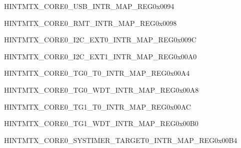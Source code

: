 \begin{register}{H}{INTMTX\_CORE0\_USB\_INTR\_MAP\_REG}{0x0094}\label{regdesc:INTMTXCORE0USBINTRMAPREG}
\end{register}\vspace{-3em}


\begin{register}{H}{INTMTX\_CORE0\_RMT\_INTR\_MAP\_REG}{0x0098}\label{regdesc:INTMTXCORE0RMTINTRMAPREG}
\end{register}\vspace{-3em}


\begin{register}{H}{INTMTX\_CORE0\_I2C\_EXT0\_INTR\_MAP\_REG}{0x009C}\label{regdesc:INTMTXCORE0I2CEXT0INTRMAPREG}
\end{register}\vspace{-3em}


\begin{register}{H}{INTMTX\_CORE0\_I2C\_EXT1\_INTR\_MAP\_REG}{0x00A0}\label{regdesc:INTMTXCORE0I2CEXT1INTRMAPREG}
\end{register}\vspace{-3em}


\begin{register}{H}{INTMTX\_CORE0\_TG0\_T0\_INTR\_MAP\_REG}{0x00A4}\label{regdesc:INTMTXCORE0TG0T0INTRMAPREG}
\end{register}\vspace{-3em}


\begin{register}{H}{INTMTX\_CORE0\_TG0\_WDT\_INTR\_MAP\_REG}{0x00A8}\label{regdesc:INTMTXCORE0TG0WDTINTRMAPREG}
\end{register}\vspace{-3em}


\begin{register}{H}{INTMTX\_CORE0\_TG1\_T0\_INTR\_MAP\_REG}{0x00AC}\label{regdesc:INTMTXCORE0TG1T0INTRMAPREG}
\end{register}\vspace{-3em}


\begin{register}{H}{INTMTX\_CORE0\_TG1\_WDT\_INTR\_MAP\_REG}{0x00B0}\label{regdesc:INTMTXCORE0TG1WDTINTRMAPREG}
\end{register}\vspace{-3em}


\begin{register}{H}{INTMTX\_CORE0\_SYSTIMER\_TARGET0\_INTR\_MAP\_REG}{0x00B4}\label{regdesc:INTMTXCORE0SYSTIMERTARGET0INTRMAPREG}
\end{register}\vspace{-3em}

